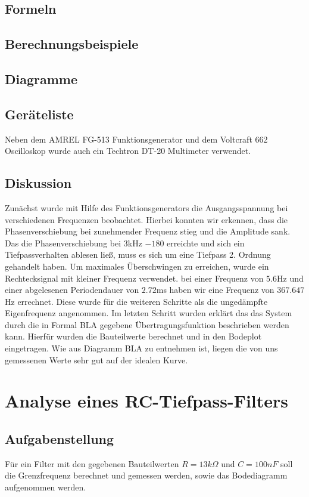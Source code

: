 \documentclass[12pt,a4paper,ngerman]{article}
\begin{document}
\subsection{Formeln}

\subsection{Berechnungsbeispiele}

\subsection{Diagramme}

\subsection{Geräteliste}
Neben dem AMREL FG-513 Funktionsgenerator und dem Voltcraft 662 Oscilloskop wurde auch ein Techtron DT-20 Multimeter verwendet.
\subsection{Diskussion}

Zunächst wurde mit Hilfe des Funktionsgenerators die Ausgangsspannung bei verschiedenen Frequenzen beobachtet. Hierbei konnten wir erkennen, dass die Phasenverschiebung bei zunehmender Frequenz stieg und die Amplitude sank. Das die Phasenverschiebung bei 3kHz $-180$ erreichte und sich ein Tiefpassverhalten ablesen ließ, muss es sich um eine Tiefpass 2. Ordnung gehandelt haben.
Um maximales Überschwingen zu erreichen, wurde ein Rechtecksignal mit kleiner Frequenz verwendet. bei einer Frequenz von $5.6$Hz und einer abgelesenen Periodendauer von $2.72$ms haben wir eine Frequenz von $367.647$Hz errechnet. Diese wurde für die weiteren Schritte als die ungedämpfte Eigenfrequenz angenommen. 
Im letzten Schritt wurden erklärt das das System durch die in Formal BLA gegebene Übertragungsfunktion beschrieben werden kann. Hierfür wurden die Bauteilwerte berechnet und in den Bodeplot eingetragen. Wie aus Diagramm BLA zu entnehmen ist, liegen die von uns gemessenen Werte sehr gut auf der idealen Kurve.



\pagebreak
\section{Analyse eines RC-Tiefpass-Filters}
\subsection{Aufgabenstellung}
Für ein Filter mit den gegebenen Bauteilwerten $R = 13k\Omega$ und $C = 100 nF$ soll die Grenzfrequenz berechnet und gemessen werden, sowie das Bodediagramm aufgenommen werden.
\end{document}
